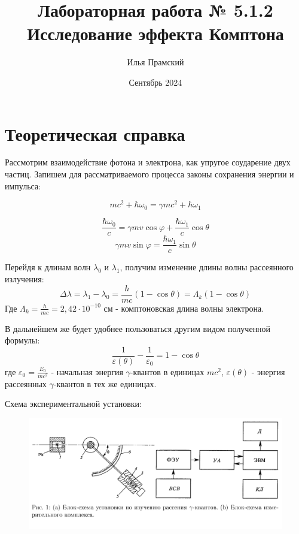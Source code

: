 \documentclass[a4paper,12pt]{article}
\title{Лабораторная работа № 5.1.2\\Исследование эффекта Комптона}
\author{Илья Прамский}
\date{Сентябрь 2024}
\begin{document}
\maketitle
\newpage
\section{Теоретическая справка}
Рассмотрим взаимодействие фотона и электрона, как упругое соударение двух частиц. Запишем для рассматриваемого процесса законы сохранения энергии и импульса:

\[mc^2 + \hbar \omega_0 = \gamma mc^2 + \hbar \omega_1\]

\begin{equation}
\frac{\hbar \omega_0}{c} = \gamma mv \cos{\varphi} + \frac{\hbar \omega_1}{c} \cos{\theta}
\end{equation}
\[\gamma mv \sin{\varphi} = \frac{\hbar \omega_1}{c} \sin{\theta}\]

Перейдя к длинам волн $\lambda_0$ и $\lambda_1$, получим изменение длины волны рассеянного излучения:
\begin{equation}
\Delta \lambda = \lambda_1 - \lambda_0 = \frac{h}{mc} (1 - \cos{\theta}) = \Lambda_k (1 - \cos{\theta})
\end{equation}
Где $\Lambda_k = \frac{h}{mc} = 2,42 \cdot 10^{-10}$ см - комптоновская длина волны электрона.

В дальнейшем же будет удобнее пользоваться другим видом полученной формулы:
\begin{equation}
\frac{1}{\varepsilon(\theta)} - \frac{1}{\varepsilon_0} = 1 - \cos{\theta}
\end{equation}
где $\varepsilon_0 = \frac{E_0}{mc^2}$ - начальная энергия $\gamma$-квантов в единицах $mc^2$, $\varepsilon(\theta)$ - энергия рассеянных $\gamma$-квантов в тех же единицах.

Схема экспериментальной установки:

\begin{figure}[H]
\centering
\includegraphics[scale=0.7]{scheme.png}
\end{figure}
\end{document}
